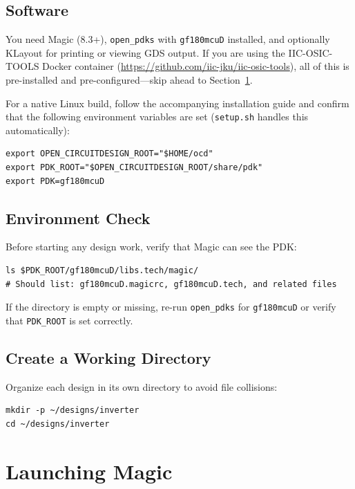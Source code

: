 \documentclass[11pt]{article}
\begin{document}
\subsection{Software}

You need Magic (8.3+), \texttt{open\_pdks} with \texttt{gf180mcuD}
installed, and optionally KLayout for printing or viewing GDS output.
If you are using the IIC-OSIC-TOOLS Docker container
(\url{https://github.com/iic-jku/iic-osic-tools}), all of this is
pre-installed and pre-configured---skip ahead to
Section~\ref{sec:launching}.

For a native Linux build, follow the accompanying installation guide
and confirm that the following environment variables are set
(\texttt{setup.sh} handles this automatically):

\begin{lstlisting}
export OPEN_CIRCUITDESIGN_ROOT="$HOME/ocd"
export PDK_ROOT="$OPEN_CIRCUITDESIGN_ROOT/share/pdk"
export PDK=gf180mcuD
\end{lstlisting}

\subsection{Environment Check}

Before starting any design work, verify that Magic can see the PDK:

\begin{lstlisting}
ls $PDK_ROOT/gf180mcuD/libs.tech/magic/
# Should list: gf180mcuD.magicrc, gf180mcuD.tech, and related files
\end{lstlisting}

If the directory is empty or missing, re-run \texttt{open\_pdks} for
\texttt{gf180mcuD} or verify that \texttt{PDK\_ROOT} is set correctly.

\subsection{Create a Working Directory}

Organize each design in its own directory to avoid file collisions:

\begin{lstlisting}
mkdir -p ~/designs/inverter
cd ~/designs/inverter
\end{lstlisting}

\section{Launching Magic}
\label{sec:launching}
\end{document}
